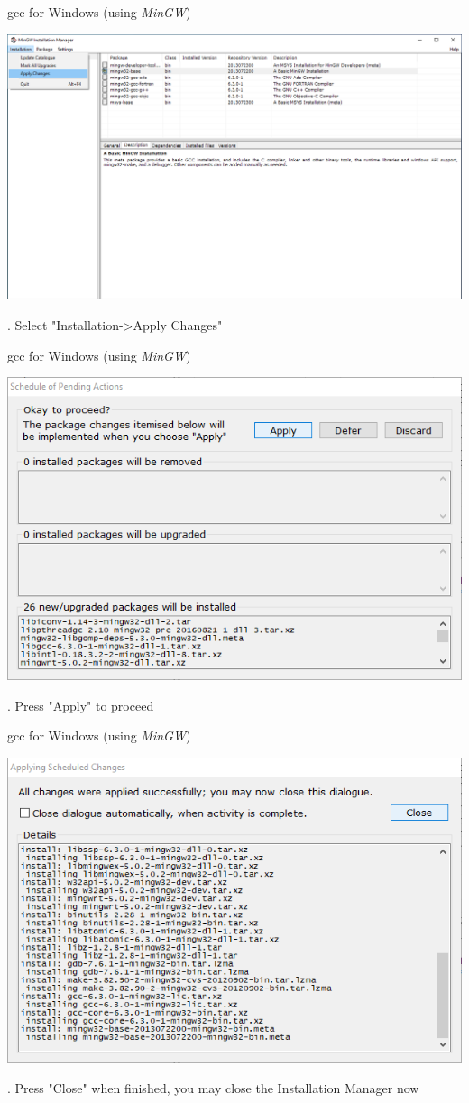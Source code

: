 \begin{frame}{gcc for Windows (using \textit{MinGW})}
	\centerline{\includegraphics[scale=.3]{../img/install/mingw/apply.png}}
	. Select "Installation->Apply Changes"
\end{frame}

\begin{frame}{gcc for Windows (using \textit{MinGW})}
	\centerline{\includegraphics[scale=.5]{../img/install/mingw/confirm.png}}
	. Press "Apply" to proceed
\end{frame}

\begin{frame}{gcc for Windows (using \textit{MinGW})}
	\centerline{\includegraphics[scale=.5]{../img/install/mingw/close.png}}
	. Press "Close" when finished, you may close the Installation Manager now
\end{frame}

